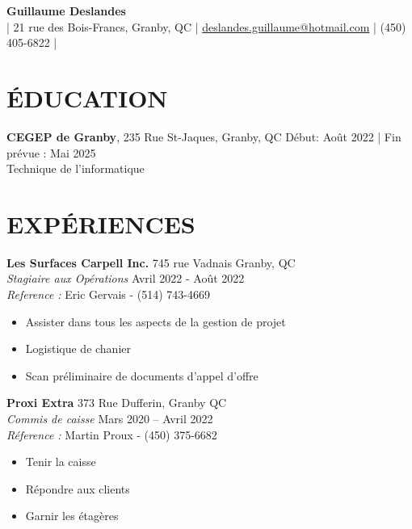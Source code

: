 \documentclass[a4paper,9pt]{extarticle}
\begin{document}
\pagestyle{empty}

\begin{center}
\textbf{\Large Guillaume Deslandes}\\[2pt] %
| 21 rue des Bois-Francs, Granby, QC | \href{mailto:deslandes.guillaume@hotmail.com}{deslandes.guillaume@hotmail.com} | (450) 405-6822 | 
\end{center}

\section*{ÉDUCATION}
\noindent
\textbf{CEGEP de Granby}, 235 Rue St-Jaques, Granby, QC \hfill Début: Août 2022 | Fin prévue :  Mai 2025\\ 
Technique de l'informatique \hfill \\ 


\section*{EXPÉRIENCES}
\noindent
\textbf{Les Surfaces Carpell Inc.} \hfill 745 rue Vadnais Granby, QC\\
\textit{Stagiaire aux Opérations} \hfill Avril 2022 - Août 2022 \\ 
\textit{Reference : } \hfill Eric Gervais - (514) 743-4669

\begin{itemize}
    \item Assister dans tous les aspects de la gestion de projet
    \item Logistique de chanier
    \item Scan préliminaire de documents d'appel d'offre
\end{itemize}

\noindent
\textbf{Proxi Extra} \hfill 373 Rue Dufferin, Granby QC\\ 
\textit{Commis de caisse} \hfill Mars 2020 – Avril 2022 \\
\textit{Réference : } \hfill Martin Proux - (450) 375-6682 

\begin{itemize}
    \item Tenir la caisse
    \item Répondre aux clients
    \item Garnir les étagères
\end{itemize}

\end{document}
